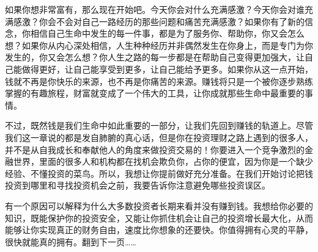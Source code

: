 如果你想非常富有，那么现在开始吧。今天你会对什么充满感激？今天你会对谁充满感激？你会不会对自己一路经历的那些问题和痛苦充满感激？如果你有了新的信念，你相信自己生命中发生的每一件事，都是为了服务你、帮助你，你又会怎么想？如果你从内心深处相信，人生种种经历并非偶然发生在你身上，而是专门为你发生的，你又会怎么想？你人生之路的每一步都是在帮助自己变得更加强大，让自己能做得更好，让自己能享受到更多，让自己能给予更多。如果你从这一点开始，钱就不再是你快乐的来源，也不再是你痛苦的来源。赚钱将只是一个被你逐步熟练掌握的有趣旅程，财富就变成了一个伟大的工具，让你成就那些生命中最重要的事情。

不过，既然钱是我们生命中如此重要的一部分，让我们先回到赚钱的轨道上。尽管我们这一章说的都是发自肺腑的真心话，但是你在投资理财之路上遇到的很多人，并不是从自我成长和奉献他人的角度来做投资交易的！你要进入一个竞争激烈的金融世界，里面的很多人和机构都在找机会欺负你，占你的便宜，因为你是一个缺少经验、不懂投资的菜鸟。所以，我想让你提前做好充分准备。在我们开始讨论把钱投资到哪里和寻找投资机会之前，我要告诉你注意避免哪些投资误区。

有一个原因可以解释为什么大多数投资者长期来看并没有赚到钱。我想给你必要的知识，既能保护你的投资安全，又能让你抓住机会让自己的投资增长最大化，从而能够让你实现真正的财务自由，速度比你想象的还要快。你值得拥有心灵的平静，很快就能真的拥有。翻到下一页……
